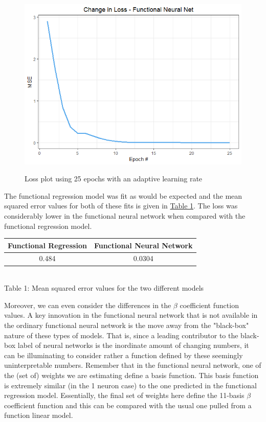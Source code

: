 \documentclass{article}
\begin{document}
\begin{figure}[h!]
  \centering
  \includegraphics[scale = 0.5]{lossplot2.png}
  \label{fig:funcNNLoss2}
  \caption{Loss plot using 25 epochs with an adaptive learning rate}
\end{figure}

\noindent The functional regression model was fit as would be expected and the mean squared error values for both of these fits is given in \hyperref[table:one]{Table 1}. The loss was considerably lower in the functional neural network when compared with the functional regression model.
\begin{center}
\label{table:one}
 \begin{tabular}{||c c||} 
 \hline
 Functional Regression & Functional Neural Network \\ [1ex] 
 \hline\hline
 0.484 & 0.0304 \\ [1ex] 
 \hline
\end{tabular}\\ \smallskip
Table 1: Mean squared error values for the two different models
\end{center}

\noindent Moreover, we can even consider the differences in the $\beta$ coefficient function values. A key innovation in the functional neural network that is not available in the ordinary functional neural network is the move away from the "black-box" nature of these types of models. That is, since a leading contributor to the black-box label of neural networks is the inordinate amount of changing numbers, it can be illuminating to consider rather a function defined by these seemingly uninterpretable numbers. Remember that in the functional neural network, one of the (set of) weights we are estimating define a basis function. This basis function is extremely similar (in the 1 neuron case) to the one predicted in the functional regression model. Essentially, the final set of weights here define the 11-basis $\beta$ coefficient function and this can be compared with the usual one pulled from a function linear model.
\end{document}
